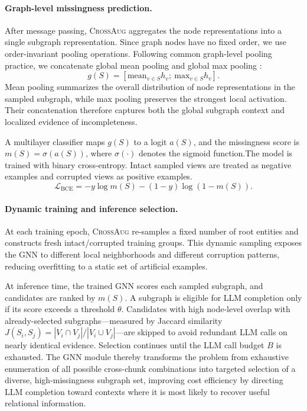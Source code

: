 \documentclass[11pt]{article}
\newcommand{\ours}{\textsc{CrossAug}\xspace}
\begin{document}
\paragraph{Graph-level missingness prediction.}
{After message passing, \ours aggregates the node representations into a single subgraph representation. Since graph nodes have no fixed order, we use order-invariant pooling operations. Following common graph-level pooling practice, we concatenate global mean pooling and global max pooling \citep{wang2024graph}:
\[
g(S)=\left[\mathrm{mean}_{v\in S} h_v;\ \mathrm{max}_{v\in S} h_v\right].
\]
Mean pooling summarizes the overall distribution of node representations in the sampled subgraph, while max pooling preserves the strongest local activation. Their concatenation therefore captures both the global subgraph context and localized evidence of incompleteness.}

{A multilayer classifier maps $g(S)$ to a logit $a(S)$, and the missingness score is $m(S)=\sigma(a(S))$, where $\sigma(\cdot)$ denotes the sigmoid function.}The model is trained with binary cross-entropy. Intact sampled views are treated as negative examples and corrupted views as positive examples. 
\[
\mathcal{L}_{\mathrm{BCE}} =
-y\log m(S) - (1-y)\log(1-m(S)).
\]

\paragraph{Dynamic training and inference selection.}
At each training epoch, \ours re-samples a fixed number of root entities and constructs fresh intact/corrupted training groups. This dynamic sampling exposes the GNN to different local neighborhoods and different corruption patterns, reducing overfitting to a static set of artificial examples. 


At inference time, the trained GNN scores each sampled subgraph, and candidates are ranked by $m(S)$. A subgraph is eligible for LLM completion only if its score exceeds a threshold $\theta$. Candidates with high node-level overlap with already-selected subgraphs---measured by Jaccard similarity $J(S_i,S_j)=|V_i\cap V_j|/|V_i\cup V_j|$---are skipped to avoid redundant LLM calls on nearly identical evidence. Selection continues until the LLM call budget $B$ is exhausted. The GNN module thereby transforms the problem from exhaustive enumeration of all possible cross-chunk combinations into targeted selection of a diverse, high-missingness subgraph set, improving cost efficiency by directing LLM completion toward contexts where it is most likely to recover useful relational information.
\end{document}
